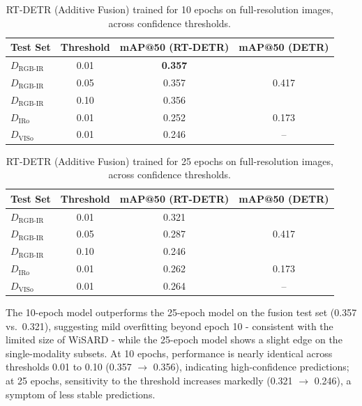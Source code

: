 \documentclass[12pt, a4paper]{article}
\begin{document}
\begin{table}[h]
\centering
\caption{RT-DETR (Additive Fusion) trained for 10 epochs on full-resolution images, across confidence thresholds.}
\label{tab:rtdetr_base_10}
\begin{tabular}{lccc}
\toprule
\textbf{Test Set} & \textbf{Threshold} & \textbf{mAP@50 (RT-DETR)} & \textbf{mAP@50 (DETR)} \\
\midrule
$D_{\text{RGB-IR}}$ & 0.01 & \textbf{0.357} & \multirow{3}{*}{0.417} \\
$D_{\text{RGB-IR}}$ & 0.05 & 0.357 & \\
$D_{\text{RGB-IR}}$ & 0.10 & 0.356 & \\
\midrule
$D_{\text{IRo}}$  & 0.01 & 0.252 & 0.173 \\
$D_{\text{VISo}}$ & 0.01 & 0.246 & -- \\
\bottomrule
\end{tabular}
\end{table}

\begin{table}[h]
\centering
\caption{RT-DETR (Additive Fusion) trained for 25 epochs on full-resolution images, across confidence thresholds.}
\label{tab:rtdetr_base_25}
\begin{tabular}{lccc}
\toprule
\textbf{Test Set} & \textbf{Threshold} & \textbf{mAP@50 (RT-DETR)} & \textbf{mAP@50 (DETR)} \\
\midrule
$D_{\text{RGB-IR}}$ & 0.01 & 0.321 & \multirow{3}{*}{0.417} \\
$D_{\text{RGB-IR}}$ & 0.05 & 0.287 & \\
$D_{\text{RGB-IR}}$ & 0.10 & 0.246 & \\
\midrule
$D_{\text{IRo}}$  & 0.01 & 0.262 & 0.173 \\
$D_{\text{VISo}}$ & 0.01 & 0.264 & -- \\
\bottomrule
\end{tabular}
\end{table}

The 10-epoch model outperforms the 25-epoch model on the fusion test set (0.357 vs.\ 0.321), suggesting mild overfitting beyond epoch 10 - consistent with the limited size of WiSARD - while the 25-epoch model shows a slight edge on the single-modality subsets. At 10 epochs, performance is nearly identical across thresholds 0.01 to 0.10 (0.357 $\to$ 0.356), indicating high-confidence predictions; at 25 epochs, sensitivity to the threshold increases markedly (0.321 $\to$ 0.246), a symptom of less stable predictions.
\end{document}
